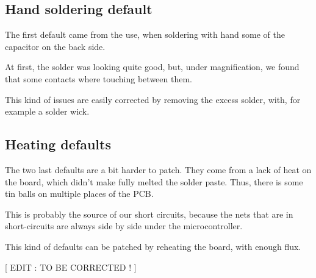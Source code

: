\subsection{Hand soldering default}
The first default came from the use, when soldering with hand some of the 
capacitor on the back side.

At first, the solder was looking quite good, but, under magnification, we 
found that some contacts where touching between them. 

This kind of issues are easily corrected by removing the excess solder, 
with, for example a solder wick.

\subsection{Heating defaults}
The two last defaults are a bit harder to patch. They come from a lack 
of heat on the board, which didn't make fully melted the solder paste.
Thus, there is some tin balls on multiple places of the PCB. 

This is probably the source of our short circuits, because the nets that 
are in short-circuits are always side by side under the microcontroller.

This kind of defaults can be patched by reheating the board, with enough 
flux.

[ EDIT : TO BE CORRECTED ! ]
